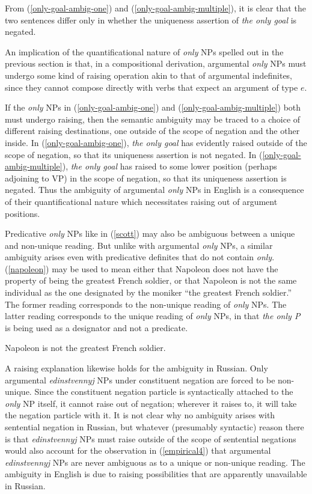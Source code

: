 From (\ref{only-goal-ambig-one}) and (\ref{only-goal-ambig-multiple}), it is clear that the two sentences differ only in whether the uniqueness assertion of \textit{the only goal} is negated.

An implication of the quantificational nature of \textit{only} NPs spelled out in the previous section is that, in a compositional derivation, argumental \textit{only} NPs must undergo some kind of raising operation akin to that of argumental indefinites, since they cannot compose directly with verbs that expect an argument of type $e$.

If the \textit{only} NPs in (\ref{only-goal-ambig-one}) and (\ref{only-goal-ambig-multiple}) both must undergo raising, then the semantic ambiguity may be traced to a choice of different raising destinations, one outside of the scope of negation and the other inside. In (\ref{only-goal-ambig-one}), \textit{the only goal} has evidently raised outside of the scope of negation, so that its uniqueness assertion is not negated. In (\ref{only-goal-ambig-multiple}), \textit{the only goal} has raised to some lower position (perhaps adjoining to VP) in the scope of negation, so that its uniqueness assertion is negated. Thus the ambiguity of argumental \textit{only} NPs in English is a consequence of their quantificational nature which necessitates raising out of argument positions.

Predicative \textit{only} NPs like in (\ref{scott}) may also be ambiguous between a unique and non-unique reading. But unlike with argumental \textit{only} NPs, a similar ambiguity arises even with predicative definites that do not contain \textit{only}. (\ref{napoleon}) may be used to mean either that Napoleon does not have the property of being the greatest French soldier, or that Napoleon is not the same individual as the one designated by the moniker ``the greatest French soldier.'' The former reading corresponds to the non-unique reading of \textit{only} NPs. The latter reading corresponds to the unique reading of \textit{only} NPs, in that \textit{the only P} is being used as a designator and not a predicate.

\begin{exe}
	\ex \label{napoleon} Napoleon is not the greatest French soldier.
\end{exe}

A raising explanation likewise holds for the ambiguity in Russian. Only argumental \textit{edinstvennyj} NPs under constituent negation are forced to be non-unique. Since the constituent negation particle is syntactically attached to the \textit{only} NP itself, it cannot raise out of negation; wherever it raises to, it will take the negation particle with it. It is not clear why no ambiguity arises with sentential negation in Russian, but whatever (presumably syntactic) reason there is that \textit{edinstvennyj} NPs must raise outside of the scope of sentential negations would also account for the observation in (\ref{empirical4}) that argumental \textit{edinstvennyj} NPs are never ambiguous as to a unique or non-unique reading. The ambiguity in English is due to raising possibilities that are apparently unavailable in Russian.

